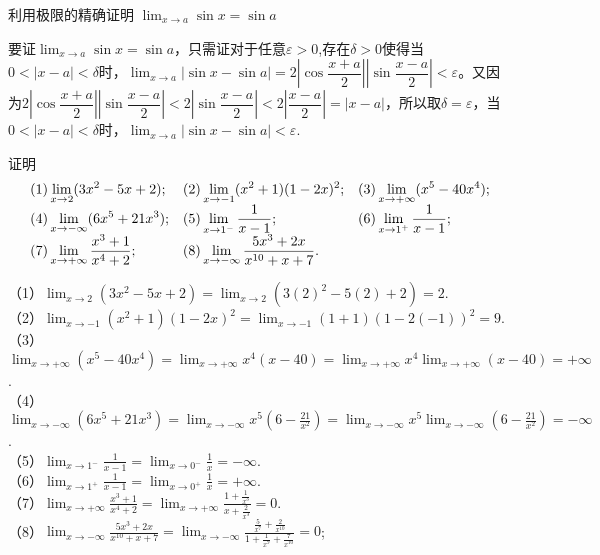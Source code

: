 \begin{example}{利用极限的精确证明}{}
   $\displaystyle\lim_{x\to a}\sin x=\sin a$
\end{example}
\begin{solution}
    要证$\displaystyle\lim_{x\to a}\sin x=\sin a$，只需证对于任意$\varepsilon>0$,存在$\delta>0$使得当$0<|x-a|<\delta$时，$\displaystyle\lim_{x\to a}|\sin x-\sin a|=2|\cos\dfrac{x+a}{2}||\sin\dfrac{x-a}{2}|<\varepsilon$。又因为$2|\cos\dfrac{x+a}{2}||\sin\dfrac{x-a}{2}|<2|\sin\dfrac{x-a}{2}|<2|\dfrac{x-a}{2}|=|x-a|$，所以取$\delta=\varepsilon$，当$0<|x-a|<\delta$时，$\displaystyle\lim_{x\to a}|\sin x-\sin a|<\varepsilon$.
\end{solution}
\begin{example}{证明}{}
   \vspace{-10pt}\[\begin{array}{l@{\quad}l@{\quad}l}
(1) \displaystyle \lim _{x \rightarrow 2}(3 x^{2}-5 x+2);&
(2) \displaystyle \lim _{x \rightarrow-1}(x^{2}+1)(1-2 x)^{2};&
(3) \displaystyle \lim _{x \rightarrow+\infty}(x^{5}-40 x^{4});\\
(4) \displaystyle \lim _{x \rightarrow-\infty}(6 x^{5}+21 x^{3});&
(5) \displaystyle \lim _{x \rightarrow 1^{-}} \frac{1}{x-1};&
(6) \displaystyle\lim _{x \rightarrow 1^{+}} \frac{1}{x-1};\\
(7) \displaystyle\lim _{x \rightarrow+\infty} \frac{x^{3}+1}{x^{4}+2};&
(8) \displaystyle \lim _{x \rightarrow-\infty} \frac{5 x^{3}+2 x}{x^{10}+x+7}.
    \end{array}\]
\end{example}
\begin{solution}
（1）$\displaystyle\lim_{x\to 2}(3 x^{2}-5 x+2)=\lim_{x\to 2}(3(2)^2-5(2)+2)=2$.\\
（2）$\displaystyle\lim_{x\to-1}(x^{2}+1)(1-2 x)^{2}=\lim_{x\to-1}(1+1)(1-2(-1))^{2}=9$.\\
（3）$\displaystyle\lim_{x\to+\infty}(x^{5}-40 x^{4})=\lim_{x\to+\infty}x^4(x-40)=\lim_{x\to+\infty}x^4\lim_{x\to+\infty}(x-40)=+\infty$.\\
（4）$\displaystyle\lim_{x\to-\infty}(6 x^{5}+21 x^{3})=\lim_{x\to-\infty}x^5(6-\frac{21}{x^2})=\lim_{x\to-\infty}x^5\lim_{x\to-\infty}(6-\frac{21}{x^2})=-\infty$.\\
（5）$\displaystyle\lim_{x\to 1^{-}} \frac{1}{x-1}=\lim_{x\to 0^{-}} \frac{1}{x}=-\infty$.\\
（6）$\displaystyle\lim_{x\to 1^{+}} \frac{1}{x-1}=\lim_{x\to 0^{+}} \frac{1}{x}=+\infty$.\\
（7）$\displaystyle\lim_{x\to+\infty} \frac{x^{3}+1}{x^{4}+2}=\lim_{x\to+\infty}\frac{1+\frac{1}{x^3}}{x+\frac{2}{x^3}}=0$.\\
（8）$\displaystyle\lim_{x\to-\infty} \frac{5 x^{3}+2 x}{x^{10}+x+7}=\lim_{x\to-\infty}\frac{\frac{5}{x^7}+\frac{2}{x^{10}}}{1+\frac{1}{x^9}+\frac{7}{x^{10}}}=0$;
\end{solution}
